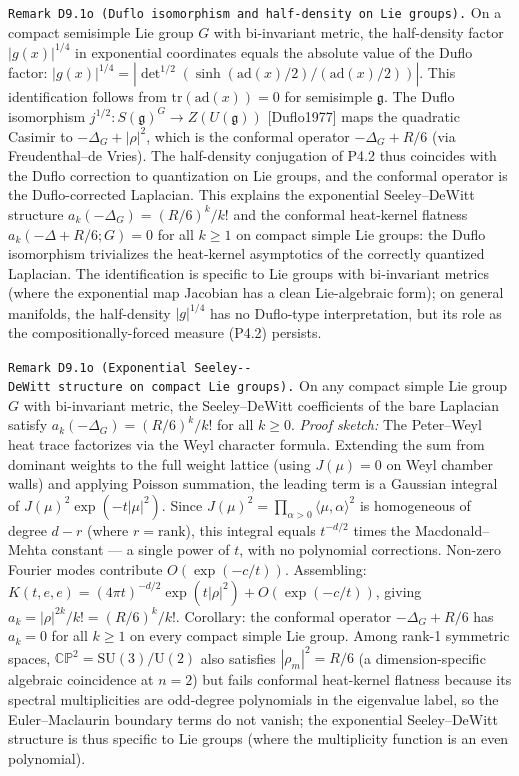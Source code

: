 \documentclass[
]{article}
\begin{document}
\texttt{Remark\ D9.1o\textquotesingle{}\ (Duflo\ isomorphism\ and\ half-density\ on\ Lie\ groups).}
On a compact semisimple Lie group \(G\) with bi-invariant metric, the
half-density factor \(|g(x)|^{1/4}\) in exponential coordinates equals
the absolute value of the Duflo factor:
\(|g(x)|^{1/4}=|\det^{1/2}(\sinh(\mathrm{ad}(x)/2)/(\mathrm{ad}(x)/2))|\).
This identification follows from \(\mathrm{tr}(\mathrm{ad}(x))=0\) for
semisimple \(\mathfrak{g}\). The Duflo isomorphism
\(j^{1/2}\colon S(\mathfrak{g})^G\to Z(U(\mathfrak{g}))\)
{[}Duflo1977{]} maps the quadratic Casimir to \(-\Delta_G+|\rho|^2\),
which is the conformal operator \(-\Delta_G+R/6\) (via Freudenthal--de
Vries). The half-density conjugation of P4.2 thus coincides with the
Duflo correction to quantization on Lie groups, and the conformal
operator is the Duflo-corrected Laplacian. This explains the exponential
Seeley--DeWitt structure \(a_k(-\Delta_G)=(R/6)^k/k!\) and the conformal
heat-kernel flatness \(a_k(-\Delta+R/6;G)=0\) for all \(k\ge 1\) on
compact simple Lie groups: the Duflo isomorphism trivializes the
heat-kernel asymptotics of the correctly quantized Laplacian. The
identification is specific to Lie groups with bi-invariant metrics
(where the exponential map Jacobian has a clean Lie-algebraic form); on
general manifolds, the half-density \(|g|^{1/4}\) has no Duflo-type
interpretation, but its role as the compositionally-forced measure
(P4.2) persists.

\texttt{Remark\ D9.1o\textquotesingle{}\textquotesingle{}\ (Exponential\ Seeley-\/-DeWitt\ structure\ on\ compact\ Lie\ groups).}
On any compact simple Lie group \(G\) with bi-invariant metric, the
Seeley--DeWitt coefficients of the bare Laplacian satisfy
\(a_k(-\Delta_G)=(R/6)^k/k!\) for all \(k\ge 0\). \emph{Proof sketch:}
The Peter--Weyl heat trace factorizes via the Weyl character formula.
Extending the sum from dominant weights to the full weight lattice
(using \(J(\mu)=0\) on Weyl chamber walls) and applying Poisson
summation, the leading term is a Gaussian integral of
\(J(\mu)^2\exp(-t|\mu|^2)\). Since
\(J(\mu)^2=\prod_{\alpha>0}\langle\mu,\alpha\rangle^2\) is homogeneous
of degree \(d-r\) (where \(r=\mathrm{rank}\)), this integral equals
\(t^{-d/2}\) times the Macdonald--Mehta constant --- a single power of
\(t\), with no polynomial corrections. Non-zero Fourier modes contribute
\(O(\exp(-c/t))\). Assembling:
\(K(t,e,e)=(4\pi t)^{-d/2}\exp(t|\rho|^2)+O(\exp(-c/t))\), giving
\(a_k=|\rho|^{2k}/k!=(R/6)^k/k!\). Corollary: the conformal operator
\(-\Delta_G+R/6\) has \(a_k=0\) for all \(k\ge 1\) on every compact
simple Lie group. Among rank-1 symmetric spaces,
\(\mathbb{CP}^2=\mathrm{SU}(3)/\mathrm{U}(2)\) also satisfies
\(|\rho_m|^2=R/6\) (a dimension-specific algebraic coincidence at
\(n=2\)) but fails conformal heat-kernel flatness because its spectral
multiplicities are odd-degree polynomials in the eigenvalue label, so
the Euler--Maclaurin boundary terms do not vanish; the exponential
Seeley--DeWitt structure is thus specific to Lie groups (where the
multiplicity function is an even polynomial).
\end{document}
